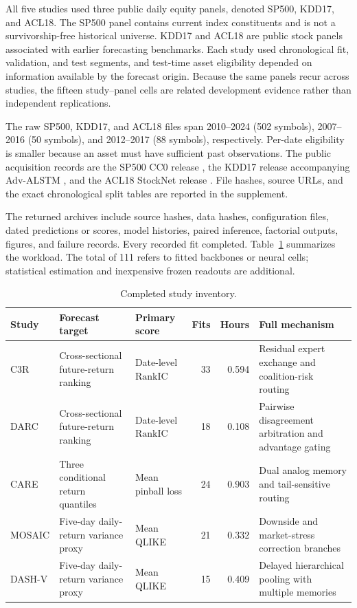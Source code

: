 \documentclass{crebss}
\newcommand{\rankic}{\mathrm{RankIC}}
\begin{document}
All five studies used three public daily equity panels, denoted SP500, KDD17, and ACL18. The SP500 panel contains current index constituents and is not a survivorship-free historical universe. KDD17 and ACL18 are public stock panels associated with earlier forecasting benchmarks. Each study used chronological fit, validation, and test segments, and test-time asset eligibility depended on information available by the forecast origin. Because the same panels recur across studies, the fifteen study--panel cells are related development evidence rather than independent replications.

The raw SP500, KDD17, and ACL18 files span 2010--2024 (502 symbols), 2007--2016 (50 symbols), and 2012--2017 (88 symbols), respectively. Per-date eligibility is smaller because an asset must have sufficient past observations. The public acquisition records are the SP500 CC0 release \citep{mvd_sp500}, the KDD17 release accompanying Adv-ALSTM \citep{feng2019enhancing}, and the ACL18 StockNet release \citep{xu2018stock}. File hashes, source URLs, and the exact chronological split tables are reported in the supplement.

The returned archives include source hashes, data hashes, configuration files, dated predictions or scores, model histories, paired inference, factorial outputs, figures, and failure records. Every recorded fit completed. Table~\ref{tab:inventory} summarizes the workload. The total of 111 refers to fitted backbones or neural cells; statistical estimation and inexpensive frozen readouts are additional.

\begin{table}[htbp]
\centering
\caption{Completed study inventory.}
\label{tab:inventory}
\small
\begin{tabular}{p{1.6cm}p{3.2cm}p{2.6cm}rrp{3.1cm}}
\toprule
Study & Forecast target & Primary score & Fits & Hours & Full mechanism \\
\midrule
C3R & Cross-sectional future-return ranking & Date-level $\rankic$ & 33 & 0.594 & Residual expert exchange and coalition-risk routing \\
DARC & Cross-sectional future-return ranking & Date-level $\rankic$ & 18 & 0.108 & Pairwise disagreement arbitration and advantage gating \\
CARE & Three conditional return quantiles & Mean pinball loss & 24 & 0.903 & Dual analog memory and tail-sensitive routing \\
MOSAIC & Five-day daily-return variance proxy & Mean QLIKE & 21 & 0.332 & Downside and market-stress correction branches \\
DASH-V & Five-day daily-return variance proxy & Mean QLIKE & 15 & 0.409 & Delayed hierarchical pooling with multiple memories \\
\bottomrule
\end{tabular}
\end{table}
\end{document}
